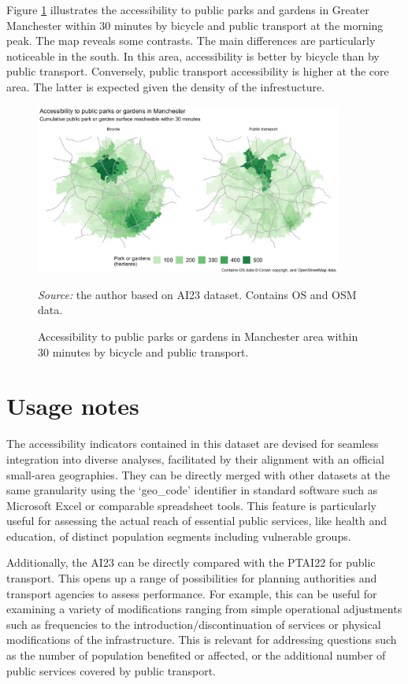 \documentclass{article}
\begin{document}
Figure \ref{fig:access-parks} illustrates the accessibility to public
parks and gardens in Greater Manchester within 30 minutes by bicycle and
public transport at the morning peak. The map reveals some contrasts.
The main differences are particularly noticeable in the south. In this
area, accessibility is better by bicycle than by public transport.
Conversely, public transport accessibility is higher at the core area.
The latter is expected given the density of the infrestucture.

\begin{figure}[!htbp]
  \centering
  \includegraphics[width=0.9\textwidth]{../plots/parks_map.jpg}
  \caption{Accessibility to public parks or gardens in Manchester area within 30 minutes by bicycle and public transport.}
  \footnotesize{\textit{Source:} the author based on AI23 dataset. Contains OS and OSM data.}
  \label{fig:access-parks}
\end{figure}

\hypertarget{usage-notes}{%
\section{Usage notes}\label{usage-notes}}

The accessibility indicators contained in this dataset are devised for
seamless integration into diverse analyses, facilitated by their
alignment with an official small-area geographies. They can be directly
merged with other datasets at the same granularity using the `geo\_code'
identifier in standard software such as Microsoft Excel or comparable
spreadsheet tools. This feature is particularly useful for assessing the
actual reach of essential public services, like health and education, of
distinct population segments including vulnerable groups.

Additionally, the AI23 can be directly compared with the PTAI22 for
public transport. This opens up a range of possibilities for planning
authorities and transport agencies to assess performance. For example,
this can be useful for examining a variety of modifications ranging from
simple operational adjustments such as frequencies to the
introduction/discontinuation of services or physical modifications of
the infrastructure. This is relevant for addressing questions such as
the number of population benefited or affected, or the additional number
of public services covered by public transport.
\end{document}
